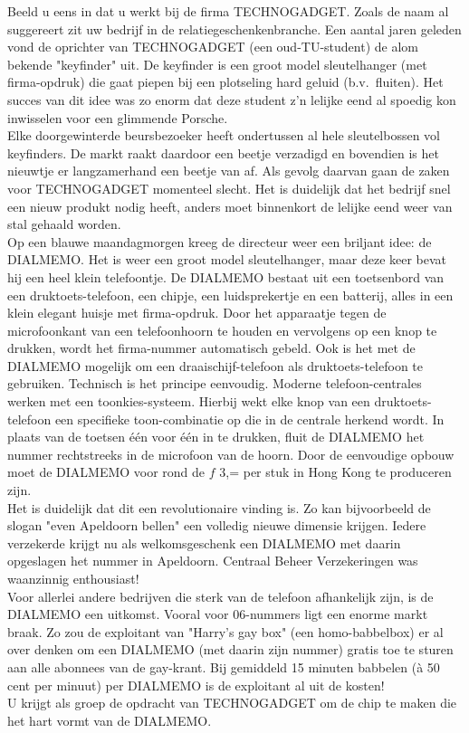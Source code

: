 Beeld u eens in dat u werkt bij de firma TECHNOGADGET.
Zoals de naam al suggereert zit uw bedrijf in de
 relatiegeschenkenbranche. Een aantal jaren geleden vond de
 oprichter van TECHNOGADGET
(een oud-TU-student) de alom bekende "keyfinder" uit. De keyfinder
is een groot model sleutelhanger (met firma-opdruk) die gaat piepen
bij een plotseling hard geluid (b.v.\ fluiten). Het succes van dit idee
was zo enorm dat deze student z'n lelijke eend al spoedig kon
inwisselen voor een glimmende Porsche.\\
Elke doorgewinterde beursbezoeker heeft ondertussen al hele 
sleutelbossen vol keyfinders. De markt raakt daardoor een beetje
verzadigd en bovendien is het nieuwtje er langzamerhand een beetje van
af. Als gevolg daarvan gaan de zaken voor TECHNOGADGET momenteel
slecht. Het is duidelijk dat het bedrijf snel een nieuw produkt nodig
heeft, anders moet binnenkort de lelijke eend weer van stal gehaald
worden.\\
Op een blauwe maandagmorgen kreeg de directeur weer een briljant idee: 
de DIALMEMO. Het is weer een groot model sleutelhanger, maar deze keer 
bevat hij een heel klein telefoontje. 
De DIALMEMO bestaat uit een toetsenbord van een druktoets-telefoon,
een chipje, een luidsprekertje en een batterij, alles in een klein
elegant huisje met firma-opdruk. Door het apparaatje tegen de
microfoonkant van een telefoonhoorn te houden en vervolgens op een
knop te drukken, wordt het firma-nummer automatisch gebeld. Ook is het
met de DIALMEMO mogelijk om een draaischijf-telefoon als
druktoets-telefoon te gebruiken.
Technisch is het principe eenvoudig. Moderne telefoon-centrales werken
met een toonkies-systeem. Hierbij wekt elke knop van een
druktoets-telefoon een specifieke toon-combinatie op die in de centrale
herkend wordt. In plaats van de toetsen \'e\'en voor \'e\'en in te
drukken, fluit de DIALMEMO het nummer rechtstreeks in de microfoon van
de hoorn. Door de eenvoudige opbouw moet de DIALMEMO voor rond de $f$
3,= per stuk in Hong Kong te produceren zijn. \\
Het is duidelijk dat dit een revolutionaire vinding is. Zo kan
bijvoorbeeld de slogan "even Apeldoorn bellen" een volledig nieuwe
dimensie krijgen. Iedere verzekerde krijgt nu als welkomsgeschenk een
DIALMEMO met daarin opgeslagen het nummer in Apeldoorn. Centraal
Beheer Verzekeringen was waanzinnig enthousiast!\\
 Voor allerlei andere
bedrijven die sterk van de telefoon afhankelijk zijn, is de DIALMEMO
een uitkomst. Vooral voor 06-nummers ligt een enorme markt braak. Zo
zou de exploitant van "Harry's gay box" (een homo-babbelbox) er al
over denken om een DIALMEMO (met daarin zijn nummer) gratis toe te
sturen aan alle abonnees van de gay-krant. Bij gemiddeld 15 minuten
babbelen (\`a 50 cent per minuut) per DIALMEMO is de exploitant al uit
de kosten!\\
U krijgt als groep de opdracht van TECHNOGADGET om de chip te maken
die het hart vormt van de DIALMEMO.


